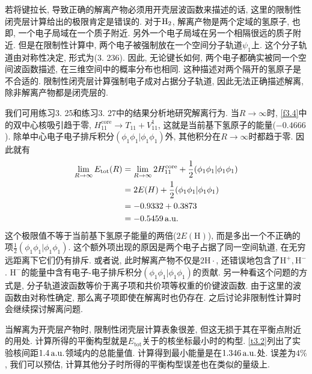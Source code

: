 若将键拉长, 
导致正确的解离产物必须用开壳层波函数来描述的话, 
这里的限制性闭壳层计算给出的极限肯定是错误的. 
对于$\mathrm{H}_2$, 
解离产物是两个定域的氢原子, 
也即, 
一个电子局域在一个质子附近. 
另外一个电子局域在另一个相隔很远的质子附近. 
但是在限制性计算中, 
两个电子被强制放在一个空间分子轨道$\psi_1$上. 
这个分子轨道由对称性决定, 
形式为(3.
236). 
因此, 
无论键长如何, 
两个电子都确实被同一个空间波函数描述, 
在三维空间中的概率分布也相同. 
这种描述对两个隔开的氢原子是不合适的. 
限制性闭壳层\hft 计算强制电子成对占据分子轨道, 
因此无法正确描述解离, 
除非解离产物都是闭壳层的.


我们可用练习3.
25和练习3.
27中的结果分析地研究解离行为. 
当$R\to\infty$时, 
\ref{f3.4}中的双中心核吸引趋于零, 
$H_{11}^\mathrm{core}\to T_{11}+V_{11}^1$, 
这就是当前基下氢原子的能量($-0.4666$). 
除单中心电子电子排斥积分$(\phi_1\phi_1|\phi_1\phi_1)$外, 
其他积分在$R\to \infty$时都趋于零. 
因此就有
\begin{align*}
	\lim_{R\to\infty} E_\mathrm{tot}(R) & = \lim_{R\to\infty} 2H_{11}^\mathrm{core} + \frac{1}{2}(\phi_1\phi_1|\phi_1\phi_1) \\
	& = 2E(H) + \frac{1}{2}(\phi_1\phi_1|\phi_1\phi_1)                                   \\
	& = -0.9332 + 0.3873                                                                 \\
	& = -0.5459\,\mathrm{a.u.}
\end{align*}
这个极限值不等于当前基下氢原子能量的两倍($2E(\mathrm{H})$), 
而是多出一个不正确的项$\frac{1}{2}(\phi_1\phi_1|\phi_1\phi_1)$. 
这个额外项出现的原因是两个电子占据了同一空间轨道, 
在无穷远距离下它们仍有排斥. 
或者说, 
此时解离产物不仅是$2\mathrm{H}\cdot$, 
还错误地包含了$\mathrm{H}^+,\mathrm{H}^-$. 
$\mathrm{H}^-$的能量中含有电子-电子排斥积分$(\phi_1\phi_1|\phi_1\phi_1)$的贡献. 
另一种看这个问题的方式是, 
分子轨道波函数等价于离子项和共价项等权重的价键波函数. 
由于这里的波函数由对称性确定, 
那么离子项即使在解离时也仍存在. 
之后讨论非限制性\hft 计算时会继续探讨解离问题.


当解离为开壳层产物时, 
限制性闭壳层\hft 计算表象很差, 
但这无损于其在平衡点附近的用处. 
计算所得的平衡构型就是$E_\mathrm{tot}$关于的核坐标最小时的构型. 
\ref{t3.2}列出了实验核间距$1.4\,\mathrm{a.u.}$领域内的总能量值. 
计算得到最小能量是在$1.346\,\mathrm{a.u.}$处. 
误差为$4\%$, 
我们可以预估, 
计算其他分子时所得的平衡构型误差也在类似的量级上. 

